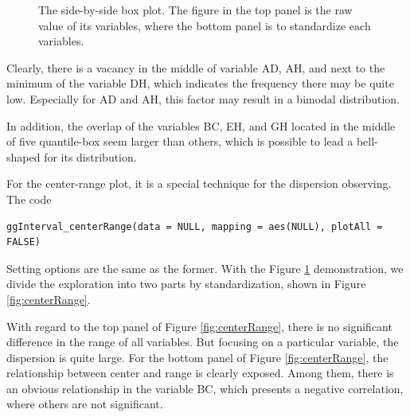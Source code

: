 \documentclass[article]{jss}
\begin{document}
\begin{figure}[htbp]
    \centering
    \caption{The side-by-side box plot. The figure in the top panel is the raw value of its variables, where the bottom panel is to standardize each variables. \label{fig:box}}
\end{figure}

Clearly, there is a vacancy in the middle of variable AD, AH, and next to the minimum of the variable DH, which indicates the frequency there may be quite low. Especially for AD and AH, this factor may result in a bimodal distribution.

In addition, the overlap of the variables BC, EH, and GH located in the middle of five quantile-box seem larger than others, which is possible to lead a bell-shaped for its distribution.

For the center-range plot, it is a special technique for the dispersion observing. The code

\begin{verbatim}
ggInterval_centerRange(data = NULL, mapping = aes(NULL), plotAll = FALSE)
\end{verbatim}

Setting options are the same as the former. With the Figure \ref{fig:box} demonstration, we divide the exploration into two parts by standardization, shown in Figure \ref{fig:centerRange}.

With regard to the top panel of Figure \ref{fig:centerRange}, there is no significant difference in the range of all variables. But focusing on a particular variable, the dispersion is quite large. For the bottom panel of Figure \ref{fig:centerRange}, the relationship between center and range is clearly exposed. Among them, there is an obvious relationship in the variable BC, which presents a negative correlation, where others are not significant.
\end{document}
